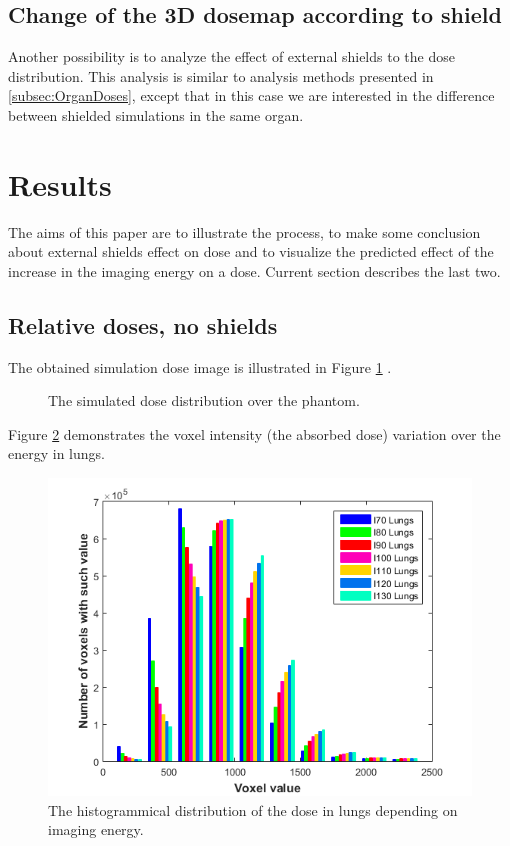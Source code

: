 \documentclass[fleqn,10pt]{SelfArx} %
\begin{document}
\subsection{Change of the 3D dosemap according to shield}
Another possibility is to analyze the effect of external shields to the dose distribution. This analysis is similar to analysis methods presented in \ref{subsec:OrganDoses}, except that in this case we are interested in the difference between shielded simulations in the same organ.




\section{Results}
The aims of this paper are to illustrate the process, to make some conclusion about external shields effect on dose and to visualize the predicted effect of the increase in the imaging energy on a dose. Current section describes the last two.

%

\subsection{Relative doses, no shields}

The obtained simulation dose image is illustrated in Figure \ref{fig:NoShieldImage} .

\begin{figure}[!hbt]\centering
\caption{The simulated dose distribution over the phantom.}
\label{fig:NoShieldImage}
\end{figure}


Figure \ref{fig:NoShieldLungs} demonstrates the voxel intensity (the absorbed dose) variation over the energy in lungs.

\begin{figure}[!hbt]\centering
\includegraphics[width=\linewidth]{NoShieldLungs}
\caption{The histogrammical distribution of the dose in lungs depending on imaging energy.}
\label{fig:NoShieldLungs}
\end{figure}
\end{document}
